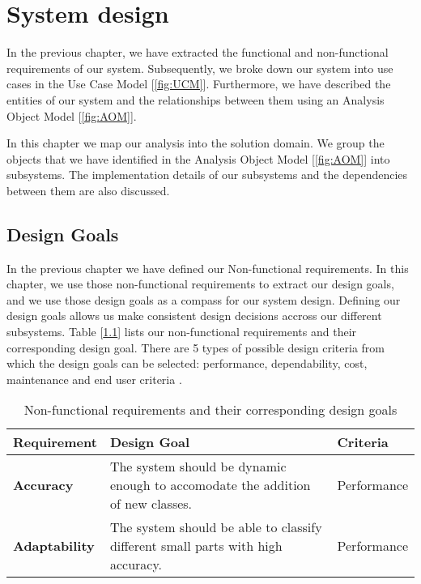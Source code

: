 \chapter{System design}

In the previous chapter, we have extracted the functional and non-functional requirements of our system. Subsequently, we broke down our system into use cases in the Use Case Model [\ref{fig:UCM}]. Furthermore, we have described the entities of our system and the relationships between them using an Analysis Object Model [\ref{fig:AOM}].

In this chapter we map our analysis into the solution domain. We group the objects that we have identified in the Analysis Object Model [\ref{fig:AOM}] into subsystems. The implementation details of our subsystems and the dependencies between them are also discussed.

\section{Design Goals}

In the previous chapter we have defined our Non-functional requirements. In this chapter, we use those non-functional requirements to extract our design goals, and we use those design goals as a compass for our system design. Defining our design goals allows us make consistent design decisions accross our different subsystems. Table [\ref{tab:DG}] lists our non-functional requirements and their corresponding design goal. There are 5 types of possible design criteria from which the design goals can be selected: performance, dependability, cost, maintenance and end user criteria \cite{bruegge2004object}.

\begin{table}
  \centering
  \begin{tabular}{ | l | p{5cm} | l | }
    \hline
    \textbf{Requirement} & \textbf{Design Goal} & \textbf{Criteria} \\ \hline
    \textbf{Accuracy} & The system should be dynamic enough to accomodate the addition of new classes. & Performance \\ \hline
    \textbf{Adaptability} & The system should be able to classify different small parts with high accuracy. & Performance \\ \hline
  \end{tabular}
  \caption{Non-functional requirements and their corresponding design goals}
  \label{tab:DG}
\end{table}

